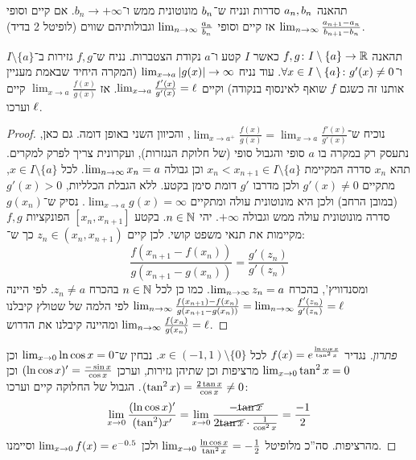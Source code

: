 \documentclass[name=רשימות חשבון דיפרנציאלי ואינטגרלי 1א]{../../../tex/classes/megasumPreamble}
\begin{document}
	\begin{Lemma}
		תהאנה $a_n, b_n$ סדרות ונניח ש־$b_n$ מונוטונית ממש ו־$b_n \to +\infty$. אם קיים וסופי $\lim_{n \to \infty} \frac{a_{n + 1} - a_n}{b_{n + 1} - b_n}$ אז קיים וסופי $\lim_{n \to \infty} \frac{a_n}{b_n}$ וגבולותיהם שווים (לופיטל 2 בדיד).
	\end{Lemma}
	\begin{Theorem}
		תהאנה $f, g \colon I \setminus \{a\} \to \mathbb{R}$ כאשר $I$ קטע ו־$a$ נקודת הצטברות. נניח ש־$f, g$ גזירות ב־$I \setminus \{a\}$ ו־$\forall x \in I \setminus \{a\} \colon g'(x) \neq 0$. עוד נניח $\lim_{x \to a}\left \lvert g(x) \right \rvert \to \infty$ (המקרה היחיד שבאמת מעניין אותנו זה כשגם $f$ שואף לאינסוף בנקודה) וקיים $\lim_{x \to a} \frac{f'(x)}{g'(x)} = \ell$. אז $\lim_{x \to a}\frac{f(x)}{g(x)}$ קיים וערכו $\ell$.
	\end{Theorem}
	\begin{proof}
		נוכיח ש־$\lim_{x \to a^{+}} \frac{f(x)}{g(x)} = \lim_{x \to a} \frac{f'(x)}{g'(x)}$, והכיוון השני באופן דומה. גם כאן, נתעסק רק במקרה בו $a$ סופי והגבול סופי (של חלוקת הנגזרות), ועקרונית צריך לפרק למקרים. תהא $x_n$ סדרה המקיימת $x_n < x_{n + 1} \in I \setminus \{a\}$ וכן גבולה $\lim_{n \to \infty} x_n = a$. לכל $x \in I \setminus \{a\}$, מתקיים $g'(x) \neq 0$ ולכן מדרבו $g'$ דומת סימן בקטע. ללא הגבלת הכלליות, $g'(x) > 0$ (במובן הרחב) ולכן היא מונוטונית עולה ומתקיים $\lim_{x \to a}g(x) = \infty$. נסיק ש־$g(x_n)$ סדרה מונוטונית עולה ממש וגבולה $+\infty$. יהי $n \in \mathbb{N}$. בקטע $[x_n, x_{n + 1}]$ הפונקציות $f, g$ מקיימות את תנאי משפט קושי. לכן קיים $z_n \in (x_n, x_{n + 1})$ כך ש־:
		\[ \frac{f(x_{n + 1} - f(x_n))}{g(x_{n + 1} - g(x_n))} = \frac{g'(z_n)}{g'(z_n)} \]
		ומסנדוויץ', בהכרח $\lim_{n \to \infty} z_n = a$. כמו כן לכל $n \in \mathbb{N}$ בהכרח $z_n \neq a$. לפי היינה
		$\lim_{n \to \infty} \frac{f(x_{n + 1}) - f(x_n)}{g(x_{n + 1} - g(x_n))}  = \lim_{n \to \infty} \frac{f'(z_n)}{g'(z_n)} = \ell$
		לפי הלמה של שטולץ קיבלנו $\lim_{n \to \infty} \frac{f(x_n)}{g(x_n)} = \ell$ ומהיינה קיבלנו את הדרוש.
	\end{proof}

	 \begin{proof}[פתרון]
		נגדיר $f(x) = e^{\frac{\ln \cos x }{\tan^2 x}}$ לכל $x \in (-1, 1) \setminus \{0\}$. נבחין ש־$\lim_{x \to 0} \ln \cos x = 0 $ וכן $\lim_{x \to 0} \tan^2 x = 0$ מרציפות וכן שתיהן גזירות, וערכן $(\ln\cos x )' = \frac{-\sin x}{\cos x}$ וכן $(\tan^2x) = \frac{2 \tan x}{\cos x} \neq 0$. הגבול של החלוקה קיים וערכו:
		\[ \lim_{x \to 0} \frac{(\ln\cos x)'}{(\tan^2)x'} = \lim_{x \to 0} \frac{-\cancel{\tan x}}{2\cancel{\tan x} \cdot \frac{1}{\cos^2 x}} = \frac{-1}{2} \]
		מהרציפות. סה''כ מלופיטל $\lim_{x \to 0} \frac{\ln\cos x}{\tan^2x} = -\frac{1}{2}$ ולכן $\lim_{x \to 0} f(x) = e^{-0.5}$ וסיימנו.
	\end{proof}
\end{document}
